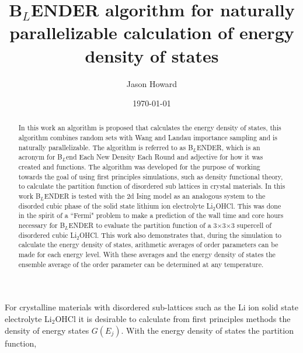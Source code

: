 \documentclass[aps,prl,reprint,superscriptaddress,showkeys]{revtex4-1}
\begin{document}
\title{B$_L$ENDER algorithm for naturally parallelizable calculation of energy density of states}

\author{Jason Howard}

\date{\today}

%


\begin{acknowledgments}
\end{acknowledgments}
\begin{abstract}
In this work  an algorithm is proposed that calculates the energy density of states, this algorithm combines random sets with Wang and Landau importance sampling  and is naturally parallelizable. The algorithm is referred to as B$_L$ENDER, which is an acronym for B$_L$end Each New Density Each Round and  adjective for  how it was created and functions. The algorithm was developed for the purpose of working towards the goal of using first principles simulations, such as density functional theory, to calculate the partition function of disordered sub lattices in crystal materials. In this work  B$_L$ENDER  is tested with the 2d Ising model as an analogous system to the disorded cubic phase of the solid state lithium ion electrolyte Li$_2$OHCl. This was done in the spirit of a ``Fermi" problem to make a prediction of the  wall time and core hours necessary for B$_L$ENDER to evaluate the partition function of a 3$\times$3$\times$3 supercell of disordered cubic Li$_2$OHCl. This work also demonstrates that, during the simulation to calculate the energy density of states, arithmetic averages of  order parameters can be made for each energy level. With these averages and the energy density of states the ensemble average of the order parameter can be determined at any temperature. 
\end{abstract}
\maketitle
For crystalline  materials  with disordered sub-lattices such as the Li ion solid state electrolyte  Li$_2$OHCl\cite{Hood, Goodenough, Schwering, Holzwarth_group, Song_Borodin} it is desirable to calculate from first principles methods the density of energy states $G(E_j)$. With the energy density of states the partition function,
\end{document}

